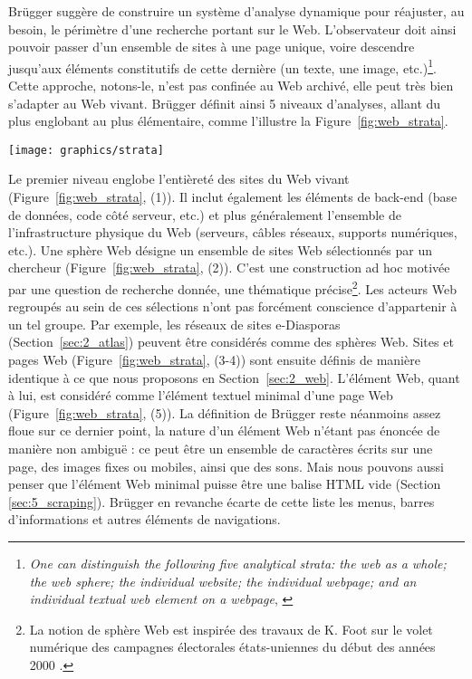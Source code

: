 \documentclass[symmetric,justified,marginals=raggedouter]{tufte-book}
\begin{document}
Brügger suggère de construire un système d'analyse dynamique pour réajuster, au besoin, le périmètre d'une recherche portant sur le Web. L'observateur doit ainsi pouvoir passer d'un ensemble de sites à une page unique, voire descendre jusqu'aux éléments constitutifs de cette dernière (un texte, une image, etc.)\footnote{\RaggedOuter \og\textit{One can distinguish the following five analytical strata: the web as a whole; the web sphere; the individual website; the individual webpage; and an individual textual web element on a webpage}\fg{}, \citep[p.10]{brugger_website_2009}}. 
Cette approche, notons-le, n'est pas confinée au Web archivé, elle peut très bien s'adapter au Web vivant. Brügger définit ainsi 5 niveaux d'analyses, allant du  plus englobant au plus élémentaire, comme l'illustre la Figure~\ref{fig:web_strata}.

\begin{figure*}
  \centering
  \texttt{[image: graphics/strata]}
  \caption{Les 5 strates analytiques du Web, d'après \citep{brugger_website_2009}}
  \label{fig:web_strata}
\end{figure*} 

\noindent Le premier niveau englobe l'entièreté des sites du Web vivant (Figure~\ref{fig:web_strata}, (1)). Il inclut également les éléments de back-end (base de données, code côté serveur, etc.) et plus généralement l'ensemble de l'infrastructure physique du Web (serveurs, câbles réseaux, supports numériques, etc.). Une sphère Web désigne un ensemble de sites Web sélectionnés par un chercheur (Figure~\ref{fig:web_strata}, (2)). C'est une construction ad hoc motivée par une question de recherche donnée, une thématique précise\footnote{\RaggedOuter La notion de sphère Web est inspirée des travaux de K. Foot sur le volet numérique des campagnes électorales états-uniennes du début des années 2000 \citep{foot_web_2006}.}. Les acteurs Web regroupés au sein de ces sélections n'ont pas forcément conscience d'appartenir à un tel groupe. Par exemple, les réseaux de sites e-Diasporas (Section~\ref{sec:2_atlas}) peuvent être considérés comme des sphères Web. Sites et pages Web (Figure~\ref{fig:web_strata}, (3-4)) sont ensuite définis de manière identique à ce que nous proposons en Section~\ref{sec:2_web}. L'élément Web, quant à lui, est considéré comme l'élément textuel minimal d'une page Web (Figure~\ref{fig:web_strata}, (5)). La définition de Brügger reste néanmoins assez floue sur ce dernier point, la nature d'un élément Web n'étant pas énoncée de manière non ambiguë : ce peut être un ensemble de caractères écrits sur une page, des images fixes ou mobiles, ainsi que des sons. Mais nous pouvons aussi penser que l'élément Web minimal puisse être une balise HTML vide (Section \ref{sec:5_scraping}). Brügger en revanche écarte de cette liste les menus, barres d'informations et autres éléments de navigations. \\
\end{document}
